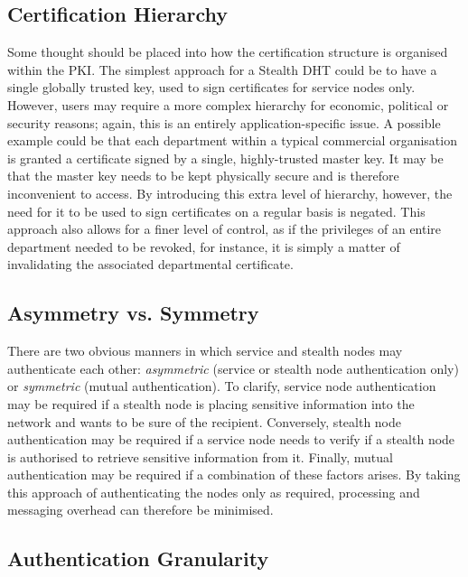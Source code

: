 \documentclass{elsart3p}
\begin{document}
\subsection{Certification Hierarchy}

Some thought should be placed into how the certification structure
is organised within the PKI. The simplest approach for a Stealth DHT
could be to have a single globally trusted key, used to sign
certificates for service nodes only. However, users may require a
more complex hierarchy for economic, political or security reasons;
again, this is an entirely application-specific issue. A possible
example could be that each department within a typical commercial
organisation is granted a certificate signed by a single,
highly-trusted master key. It may be that the master key needs to be
kept physically secure and is therefore inconvenient to access. By
introducing this extra level of hierarchy, however, the need for it
to be used to sign certificates on a regular basis is negated. This
approach also allows for a finer level of control, as if the
privileges of an entire department needed to be revoked, for
instance, it is simply a matter of invalidating the associated
departmental certificate.

\subsection{Asymmetry vs. Symmetry}

There are two obvious manners in which service and stealth nodes may
authenticate each other: \emph{asymmetric} (service or stealth node
authentication only) or \emph{symmetric} (mutual authentication). To
clarify, service node authentication may be required if a stealth
node is placing sensitive information into the network and wants to
be sure of the recipient. Conversely, stealth node authentication
may be required if a service node needs to verify if a stealth node
is authorised to retrieve sensitive information from it. Finally,
mutual authentication may be required if a combination of these
factors arises. By taking this approach of authenticating the nodes
only as required, processing and messaging overhead can therefore be
minimised.

\subsection{Authentication Granularity}
\label{subsect-granularity}
\end{document}

